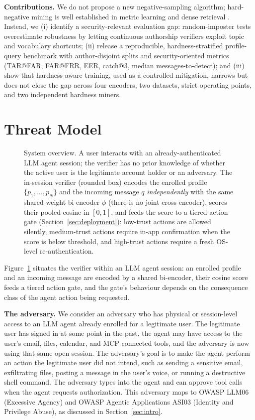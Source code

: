 \documentclass[11pt]{article}
\begin{document}
\noindent\textbf{Contributions.} We do not propose a new negative-sampling algorithm; hard-negative mining is well established in metric learning and dense retrieval \citep{schroff2015facenet,xiong2021ance,robinson2021hard}. Instead, we (i) identify a security-relevant evaluation gap: random-imposter tests overestimate robustness by letting continuous authorship verifiers exploit topic and vocabulary shortcuts; (ii) release a reproducible, hardness-stratified profile-query benchmark with author-disjoint splits and security-oriented metrics (TAR@FAR, FAR@FRR, EER, catch@3, median messages-to-detect); and (iii) show that hardness-aware training, used as a controlled mitigation, narrows but does not close the gap across four encoders, two datasets, strict operating points, and two independent hardness miners.

\section{Threat Model}
\label{sec:threat}

\begin{figure}[t]
\centering
\resizebox{0.95\textwidth}{!}{}
\caption{System overview. A user interacts with an already-authenticated LLM agent session; the verifier has no prior knowledge of whether the active user is the legitimate account holder or an adversary. The in-session verifier (rounded box) encodes the enrolled profile $\{p_1,\dots,p_N\}$ and the incoming message $q$ \emph{independently} with the same shared-weight bi-encoder $\phi$ (there is no joint cross-encoder), scores their pooled cosine in $[0,1]$, and feeds the score to a tiered action gate (Section~\ref{sec:deployment}): low-trust actions are allowed silently, medium-trust actions require in-app confirmation when the score is below threshold, and high-trust actions require a fresh OS-level re-authentication.}
\label{fig:system_overview}
\end{figure}

Figure~\ref{fig:system_overview} situates the verifier within an LLM agent session: an enrolled profile and an incoming message are encoded by a shared bi-encoder, their cosine score feeds a tiered action gate, and the gate's behaviour depends on the consequence class of the agent action being requested.

\noindent\textbf{The adversary.} We consider an adversary who has physical or session-level access to an LLM agent already enrolled for a legitimate user. The legitimate user has signed in at some point in the past, the agent may have access to the user's email, files, calendar, and MCP-connected tools, and the adversary is now using that same open session. The adversary's goal is to make the agent perform an action the legitimate user did not intend, such as sending a sensitive email, exfiltrating files, posting a message in the user's voice, or running a destructive shell command. The adversary types into the agent and can approve tool calls when the agent requests authorization. This adversary maps to OWASP LLM06 (Excessive Agency) and OWASP Agentic Applications ASI03 (Identity and Privilege Abuse), as discussed in Section~\ref{sec:intro}.
\end{document}
